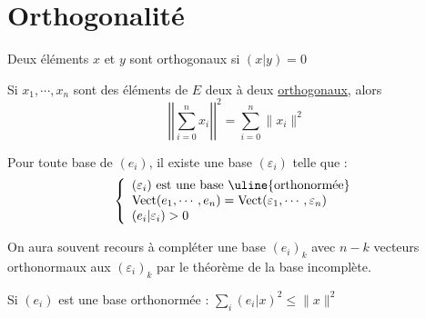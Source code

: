 \documentclass[11pt,a4paper,fleqn,pdftex]{report}
\begin{document}
\section{Orthogonalité}
\begin{dfn}
Deux éléments $x$ et $y$ sont orthogonaux si $(x|y)=0$
\end{dfn}
\begin{theorem}[Pythagore]
Si $x_1, \cdots , x_n$ sont des éléments de $E$ deux à deux \uline{orthogonaux}, alors 
\begin{equation}
\left| \left| \sum_{i=0}^{n} x_i \right| \right| ^2 = \sum_{i=0}^n  \| x_i\| ^2
\end{equation}
\end{theorem}
\begin{itheorem}
Pour toute base de $(e_i)$, il existe une base $(\varepsilon_i)$ telle que :
\begin{equation}
\left\lbrace
\begin{array}{l}
(\varepsilon_i)\text{ est une base \uline{orthonormée}}\\
\mathrm{Vect}(e_1,\cdots ,e_n) = \mathrm{Vect}(\varepsilon_1, \cdots ,\varepsilon_n)\\
(e_i|\varepsilon_i) > 0
\end{array}
\right.
\end{equation}

On aura souvent recours à compléter une base $(e_i)_k$ avec $n-k$ vecteurs orthonormaux aux $(\varepsilon_i)_k$ par le théorème de la base incomplète.
\end{itheorem}
\begin{theorem}
Si $(e_i)$ est une base orthonormée : 
$\boxed{\sum_i (e_i|x)^2 \le \| x \|^2}$
\end{theorem}
\end{document}
